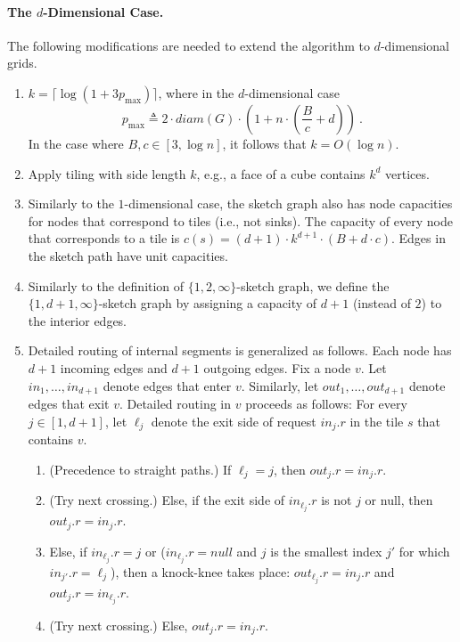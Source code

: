 \documentclass[11pt]{article}
\newcommand{\pmax}{p_{\max}}
\newenvironment{proof sketch}[1]{\noindent {\emph{Proof sketch of #1:}}}{\hfill \qed}
\newcommand{\diam}{\textit{diam}}
\begin{document}
\paragraph{The $d$-Dimensional Case.}\label{sec:algd}
The following modifications are needed to extend the algorithm to $d$-dimensional grids.
\begin{enumerate}[(1)]
\item $k = \lceil \log (1+3\pmax) \rceil$, where in the
    $d$-dimensional case
  $$\pmax\triangleq 2 \cdot \diam(G)\cdot \left(1+n\cdot \left(\frac{B}{c} + d \right)\right) \:.$$
    In the case where $B,c \in [3,\log n]$, it follows that $k = O(\log
    n)$.


\item Apply tiling with side length $k$, e.g., a face of a cube contains $k^d$ vertices.

\item Similarly to the $1$-dimensional case, the sketch graph also has node capacities for nodes that correspond to tiles (i.e.,
not sinks). The capacity of every node that corresponds to a tile is $c(s)=(d+1)\cdot k^{d+1}\cdot (B+d\cdot c)$.
Edges in the sketch path have unit capacities.

\item Similarly to the definition of $\{1,2,\infty\}$-sketch graph, we define the
  $\{1,d+1,\infty\}$-sketch graph by assigning a capacity of $d+1$ (instead of $2$)
  to the interior edges.

\item Detailed routing of internal segments is generalized as follows. Each node has
  $d+1$ incoming edges and $d+1$ outgoing edges. Fix a node $v$. Let
  $in_1,\ldots, in_{d+1}$ denote edges that enter $v$.  Similarly, let
  $out_1,\ldots,out_{d+1}$ denote edges that exit $v$.  Detailed routing in $v$
  proceeds as follows:
For every $j\in[1,d+1]$, let $\ell_j$ denote the exit side of request
    $in_j.r$ in the tile $s$ that contains $v$.
  \begin{enumerate}
  \item (Precedence to straight paths.) If $\ell_j=j$, then $out_j.r=in_j.r$.
  \item (Try next crossing.) Else, if the exit side of $in_{\ell_j}.r$ is not $j$ or null, then
    $out_j.r=in_j.r$.
  \item Else, if $in_{\ell_j}.r=j$ or ($in_{\ell_j}.r=null$ and $j$ is the smallest index $j'$ for which $in_{j'}.r=\ell_j$), then a knock-knee takes place: $out_{\ell_j}.r=in_j.r$ and $out_{j}.r=in_{\ell_j}.r$.
  \item (Try next crossing.) Else, $out_j.r=in_j.r$.
  \end{enumerate}


\end{enumerate}
\end{document}
